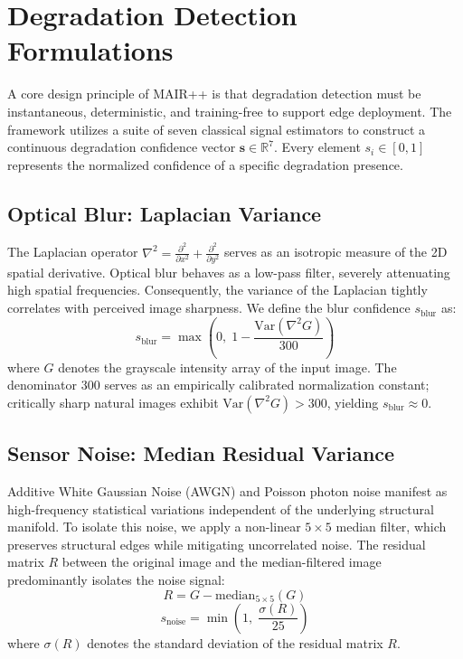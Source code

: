 \documentclass[journal, 10pt]{IEEEtran}
\begin{document}
\section{Degradation Detection Formulations}

A core design principle of MAIR++ is that degradation detection must be instantaneous, deterministic, and training-free to support edge deployment. The framework utilizes a suite of seven classical signal estimators to construct a continuous degradation confidence vector $\mathbf{s} \in \mathbb{R}^7$. Every element $s_i \in [0, 1]$ represents the normalized confidence of a specific degradation presence.

\subsection{Optical Blur: Laplacian Variance}
The Laplacian operator $\nabla^2 = \frac{\partial^2}{\partial x^2} + \frac{\partial^2}{\partial y^2}$ serves as an isotropic measure of the 2D spatial derivative. Optical blur behaves as a low-pass filter, severely attenuating high spatial frequencies. Consequently, the variance of the Laplacian tightly correlates with perceived image sharpness. We define the blur confidence $s_{\text{blur}}$ as:
\begin{equation} \label{eq:blur}
    s_{\text{blur}} = \max\!\left(0,\; 1 - \frac{\text{Var}(\nabla^2 G)}{300}\right)
\end{equation}
where $G$ denotes the grayscale intensity array of the input image. The denominator $300$ serves as an empirically calibrated normalization constant; critically sharp natural images exhibit $\text{Var}(\nabla^2 G) > 300$, yielding $s_{\text{blur}} \approx 0$.

\subsection{Sensor Noise: Median Residual Variance}
Additive White Gaussian Noise (AWGN) and Poisson photon noise manifest as high-frequency statistical variations independent of the underlying structural manifold. To isolate this noise, we apply a non-linear $5\times5$ median filter, which preserves structural edges while mitigating uncorrelated noise. The residual matrix $R$ between the original image and the median-filtered image predominantly isolates the noise signal:
\begin{equation} \label{eq:noise_res}
    R = G - \text{median}_{5\times5}(G)
\end{equation}
\begin{equation} \label{eq:noise_conf}
    s_{\text{noise}} = \min\!\left(1,\; \frac{\sigma(R)}{25}\right)
\end{equation}
where $\sigma(R)$ denotes the standard deviation of the residual matrix $R$.
\end{document}
